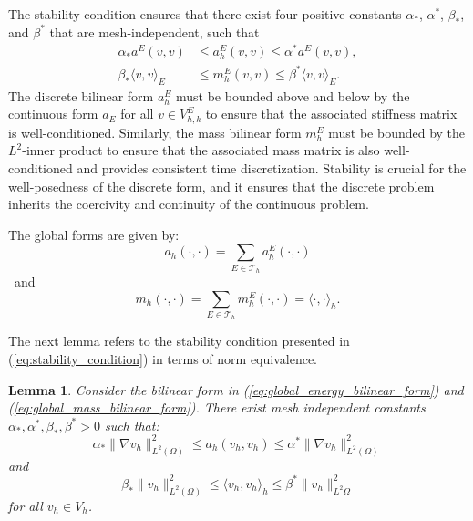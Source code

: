 \documentclass{article}
\newtheorem{lemma}{Lemma}[section]
\begin{document}
The stability condition ensures that there exist four positive constants $\alpha_*$, $\alpha^*$, $\beta_*$, and $\beta^*$ that are mesh-independent, such that
\begin{equation}\label{eq:stability_condition}
    \begin{split}
        \alpha_* a^E(v,v) &\leq a^E_h(v,v) \leq  \alpha^* a^E(v,v), \\
        \beta_* \langle  v,v \rangle_E &\leq m^E_h(v,v) \leq \beta^* \langle v,v \rangle_E.
    \end{split}
\end{equation}
The discrete bilinear form $a^E_h$ must be bounded above and below by the continuous form $a_{E}$ for all $v \in V^E_{h,k}$ to ensure that the associated stiffness matrix is well-conditioned. Similarly, the mass bilinear form $m^E_h$ must be bounded by the $L^2$-inner product to ensure that the associated mass matrix is also well-conditioned and provides consistent time discretization. Stability is crucial for the well-posedness of the discrete  form, and it ensures that the discrete problem inherits the coercivity and continuity of the continuous problem.

The global forms are given by:
\begin{equation}\label{eq:global_energy_bilinear_form}
    a_h(\cdot, \cdot) = \sum \limits_{E\in\mathcal{T}_h}a^E_h (\cdot, \cdot)
\end{equation}\
and
\begin{equation}\label{eq:global_mass_bilinear_form}
    m_h (\cdot, \cdot) = \sum \limits_{E\in \mathcal{T}_h} m^E_h (\cdot, \cdot) = \langle \cdot, \cdot \rangle_h.
\end{equation}

The next lemma refers to the stability condition presented in (\ref{eq:stability_condition}) in terms of norm equivalence.
\begin{lemma}
    Consider the bilinear form in (\ref{eq:global_energy_bilinear_form}) and (\ref{eq:global_mass_bilinear_form}). There exist mesh independent constants $\alpha_*, \alpha^*, \beta_*, \beta^* > 0$ such that:
    \begin{equation}\label{eq:aux_ineq_energy_stab}
        \alpha_* \| \nabla v_h \|_{L^2(\Omega)}^2 \leq a_h (v_h, v_h) \leq \alpha^* \| \nabla v_h \|^2_{L^2(\Omega)}
    \end{equation}
    and
    \begin{equation}\label{eq:aux_ineq_mass_stab}
        \beta_* \| v_h \|_{L^2(\Omega)}^2 \leq \langle v_h, v_h \rangle_h \leq \beta^* \| v_h \|_{L^2{\Omega}}^2
    \end{equation}
    for all $v_h \in V_h$.
\end{lemma}
\end{document}

